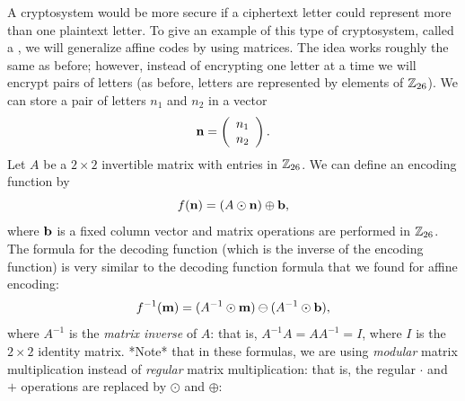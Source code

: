 A cryptosystem would be more secure if a ciphertext letter could
represent more than one plaintext letter.  To give an example of this
type of cryptosystem, called a , we will generalize
affine codes by using matrices. The idea works roughly the same as
before; however, instead of encrypting one letter at a time we will
encrypt pairs of letters (as before, letters are represented by elements of ${\Bbb Z}_{26}$).  We can store a pair of letters $n_1$ and
$n_2$ in a vector  
$$
{\bold n} = 
\left(
\begin{array}{c}
n_1 \\ n_2
\end{array}
\right).
$$
Let $A$ be a $2 \times 2$ invertible matrix
with entries in ${\Bbb Z}_{26}$. We can define an encoding function by
$$
f({\bold n}) = (A \odot {\bold n}) \oplus {\bold b} ,
$$
where ${\bold b}$ is a fixed column vector and matrix operations are
performed in ${\Bbb Z}_{26}$. The formula for  the decoding function (which is the inverse of the encoding function) is very similar to the decoding function formula that we found for affine encoding:
$$
f^{-1}({\bold m}) = (A^{-1} \odot {\bold m}) \ominus (A^{-1} \odot {\bold b}),
$$
where $A^{-1}$ is the \emph{matrix inverse} of $A$: that is, $A^{-1}A = A A^{-1} = I$, where $I$ is the $2 \times 2$ identity matrix.  *Note* that in these formulas, we are using \emph{modular} matrix multiplication instead of \emph{regular} matrix multiplication: that is, the  regular $\cdot$ and $+$ operations are replaced by  $\odot$ and $\oplus$:

